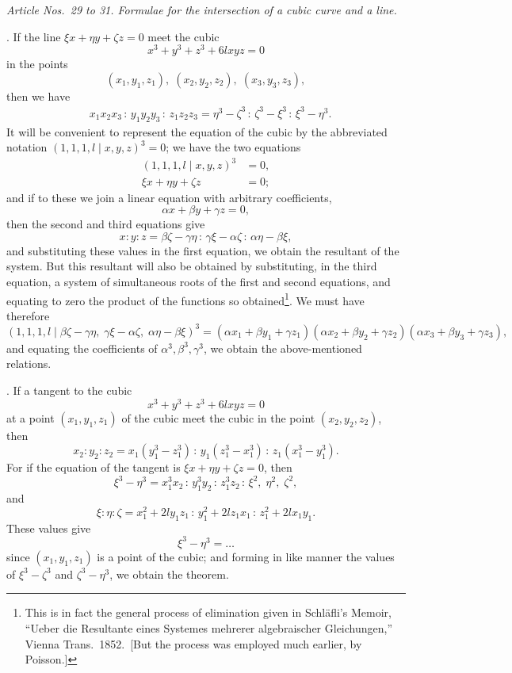 \documentclass[11pt]{article}
\begin{document}
\textit{Article Nos.~29 to 31. Formulae for the intersection of a cubic curve and a line.}

\medskip

. If the line $\xi x + \eta y + \zeta z = 0$ meet the cubic
\[
x^3 + y^3 + z^3 + 6 l x y z = 0
\]
in the points
\[
(x_1, y_1, z_1),\; (x_2, y_2, z_2),\; (x_3, y_3, z_3),
\]
then we have
\begin{align*}
&x_1 x_2 x_3 \,:\, y_1 y_2 y_3 \,:\, z_1 z_2 z_3 = \eta^3 - \zeta^3 \,:\, \zeta^3 - \xi^3 \,:\, \xi^3 - \eta^3.
\end{align*}
It will be convenient to represent the equation of the cubic by the abbreviated notation $(1, 1, 1, l \mid x, y, z)^3 = 0$; we have the two equations
\begin{align*}
(1, 1, 1, l \mid x, y, z)^3 &= 0, \\
\xi x + \eta y + \zeta z &= 0;
\end{align*}
and if to these we join a linear equation with arbitrary coefficients,
\[
\alpha x + \beta y + \gamma z = 0,
\]
then the second and third equations give
\[
x : y : z = \beta\zeta - \gamma\eta \,:\, \gamma\xi - \alpha\zeta \,:\, \alpha\eta - \beta\xi,
\]
and substituting these values in the first equation, we obtain the resultant of the system. But this resultant will also be obtained by substituting, in the third equation, a system of simultaneous roots of the first and second equations, and equating to zero the product of the functions so obtained\footnote{This is in fact the general process of elimination given in Schl\"afli's Memoir, ``Ueber die Resultante eines Systemes mehrerer algebraischer Gleichungen,'' Vienna Trans.\ 1852.\ [But the process was employed much earlier, by Poisson.]}. We must have therefore
\[
(1, 1, 1, l \mid \beta\zeta - \gamma\eta,\; \gamma\xi - \alpha\zeta,\; \alpha\eta - \beta\xi)^3 = (\alpha x_1 + \beta y_1 + \gamma z_1)(\alpha x_2 + \beta y_2 + \gamma z_2)(\alpha x_3 + \beta y_3 + \gamma z_3),
\]
and equating the coefficients of $\alpha^3, \beta^3, \gamma^3$, we obtain the above-mentioned relations.

\medskip

. If a tangent to the cubic
\[
x^3 + y^3 + z^3 + 6 l x y z = 0
\]
at a point $(x_1, y_1, z_1)$ of the cubic meet the cubic in the point $(x_2, y_2, z_2)$, then
\[
x_2 : y_2 : z_2 = x_1 (y_1^3 - z_1^3) \,:\, y_1 (z_1^3 - x_1^3) \,:\, z_1 (x_1^3 - y_1^3).
\]
For if the equation of the tangent is $\xi x + \eta y + \zeta z = 0$, then
\[
\xi^3 - \eta^3 = x_1^3 x_2 \,:\, y_1^3 y_2 \,:\, z_1^3 z_2 \,:\, \xi^2,\; \eta^2,\; \zeta^2,
\]
and
\[
\xi : \eta : \zeta = x_1^2 + 2 l y_1 z_1 \,:\, y_1^2 + 2 l z_1 x_1 \,:\, z_1^2 + 2 l x_1 y_1.
\]
These values give
\[
\xi^3 - \eta^3 = \ldots
\]
since $(x_1, y_1, z_1)$ is a point of the cubic; and forming in like manner the values of $\xi^3 - \zeta^3$ and $\zeta^3 - \eta^3$, we obtain the theorem.
\end{document}
